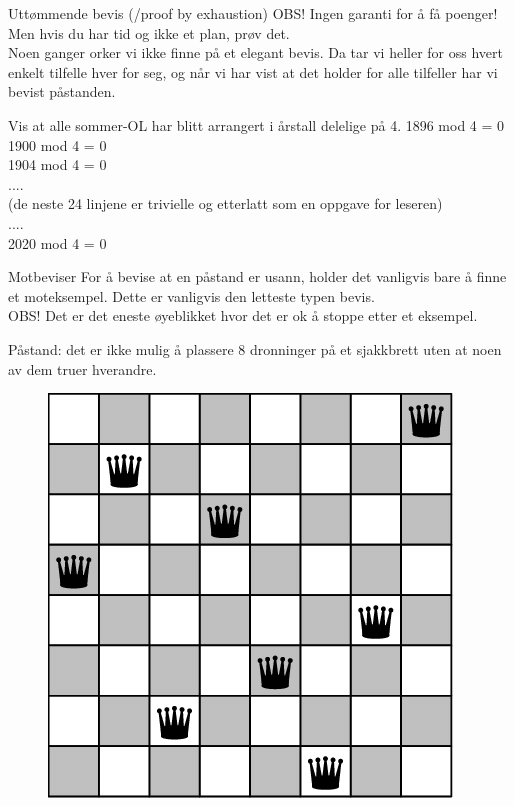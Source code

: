 \begin{frame}{Uttømmende bevis (/proof by exhaustion)}
    OBS! Ingen garanti for å få poenger! Men hvis du har tid og ikke et plan, prøv det.\\
    Noen ganger orker vi ikke finne på et elegant bevis. Da tar vi heller for oss hvert enkelt tilfelle hver for seg, og når vi har vist at det holder for alle tilfeller har vi bevist påstanden.
    \pause
    \begin{block}{Vis at alle sommer-OL har blitt arrangert i årstall delelige på 4.}
        1896 mod 4 = 0 \checkmark \\
        1900 mod 4 = 0 \checkmark \\
        1904 mod 4 = 0 \checkmark \\
        .... \\
        (de neste 24 linjene er trivielle og etterlatt som en oppgave for leseren)\\
        ....\\
        2020 mod 4 = 0 \checkmark
    \end{block}
\end{frame}

\begin{frame}{Motbeviser}
    For å bevise at en påstand er usann, holder det vanligvis bare å finne et moteksempel. Dette er vanligvis den letteste typen bevis.\\
    OBS! Det er det eneste øyeblikket hvor det er ok å stoppe etter et eksempel.
    \pause
    \begin{block}{Påstand: det er ikke mulig å plassere 8 dronninger på et sjakkbrett uten at noen av dem truer hverandre.}
    \pause
    \begin{figure}
        \centering
        \includegraphics[scale=0.20]{images/8 queens.png}
        \label{fig:my_label}
    \end{figure}
    
    \end{block}
\end{frame}

